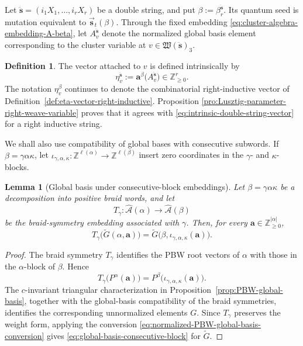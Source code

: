 \documentclass[12pt, reqno]{amsart}
\theoremstyle{plain}
\newtheorem{lemma}[theorem]{Lemma}
\theoremstyle{definition}
\newtheorem{definition}[theorem]{Definition}
\numberwithin{equation}{section}
\newcommand{\ZZ}{\mathbb{Z}}
\newcommand{\cA}{\mathcal{A}}
\begin{document}
Let \(\ddot{\mathbf s}=(i_1X_1,\ldots,i_rX_r)\) be a double string,
and put \(\beta:=\beta_r^{\ddot{\mathbf s}}\). Its quantum seed is
mutation equivalent to \(\overrightarrow{\mathbf s}_t(\beta)\).
Through the fixed embedding
\eqref{eq:cluster-algebra-embedding-A-beta}, let
\(A_v^{\ddot{\mathbf s}}\) denote the normalized global basis element
corresponding to the cluster variable at
\(v\in\mathfrak W(\ddot{\mathbf s})_3\).

\begin{definition}\label{def:vector-double-inductive}
The vector attached to \(v\) is defined intrinsically by
\begin{equation}\label{eq:intrinsic-double-string-vector}
    \eta_v^{\ddot{\mathbf s}}
    :=\mathbf a^\beta\bigl(A_v^{\ddot{\mathbf s}}\bigr)
    \in\ZZ_{\geq0}^r.
\end{equation}
The notation \(\eta_v^\beta\) continues to denote the combinatorial
right-inductive vector of
Definition~\ref{def:eta-vector-right-inductive}. Proposition
\ref{pro:Lusztig-parameter-right-weave-variable} proves that it
agrees with \eqref{eq:intrinsic-double-string-vector} for a right
inductive string.
\end{definition}


We shall also use compatibility of global bases with consecutive
subwords. If \(\beta=\gamma\alpha\kappa\), let
\(\iota_{\gamma,\alpha,\kappa}\colon
\ZZ^{\ell(\alpha)}\to\ZZ^{\ell(\beta)}\) insert zero coordinates in
the \(\gamma\)- and \(\kappa\)-blocks.

\begin{lemma}[Global basis under consecutive-block embeddings]
\label{lem:global-basis-consecutive-block}
Let
\(
    \beta=\gamma\alpha\kappa
\)
be a decomposition into positive braid words, and let
\[
    T_\gamma\colon
    \widehat{\cA}(\alpha)
    \longrightarrow
    \widehat{\cA}(\beta)
\]
be the braid-symmetry embedding associated with \(\gamma\). Then, for every
\(\mathbf a\in\ZZ_{\geq0}^{|\alpha|}\),
\begin{equation}\label{eq:global-basis-consecutive-block}
    T_\gamma\bigl(\widetilde G(\alpha,\mathbf a)\bigr)
    =
    \widetilde G\bigl(
        \beta,
        \iota_{\gamma,\alpha,\kappa}(\mathbf a)
    \bigr).
\end{equation}
\end{lemma}
\begin{proof}
The braid symmetry \(T_\gamma\) identifies the PBW root vectors of
\(\alpha\) with those in the \(\alpha\)-block of \(\beta\). Hence
\[
    T_\gamma\bigl(P^\alpha(\mathbf a)\bigr)
    =
    P^\beta\bigl(
        \iota_{\gamma,\alpha,\kappa}(\mathbf a)
    \bigr).
\]
The \(c\)-invariant triangular characterization in
Proposition~\ref{prop:PBW-global-basis}, together with the global-basis
compatibility of the braid symmetries, identifies the corresponding
unnormalized elements \(G\). Since \(T_\gamma\) preserves the weight
form, applying the conversion
\eqref{eq:normalized-PBW-global-basis-conversion} gives
\eqref{eq:global-basis-consecutive-block} for \(\widetilde G\).
\end{proof}
\end{document}
